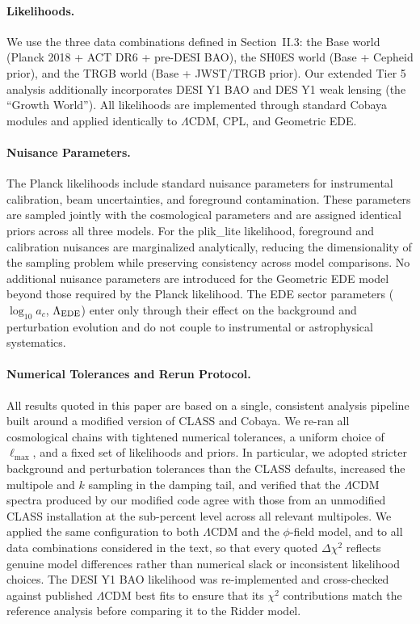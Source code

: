 \documentclass[a4paper,11pt]{article}
\begin{document}
\paragraph{Likelihoods.}
We use the three data combinations defined in Section~II.3: the Base world (Planck 2018 + ACT DR6 + pre-DESI BAO), the SH0ES world (Base + Cepheid prior), and the TRGB world (Base + JWST/TRGB prior). Our extended Tier 5 analysis additionally incorporates DESI Y1 BAO and DES Y1 weak lensing (the ``Growth World''). All likelihoods are implemented through standard Cobaya modules and applied identically to $\Lambda$CDM, CPL, and Geometric EDE.

\paragraph{Nuisance Parameters.}
The Planck likelihoods include standard nuisance parameters for instrumental calibration, beam uncertainties, and foreground contamination. These parameters are sampled jointly with the cosmological parameters and are assigned identical priors across all three models. For the plik\_lite likelihood, foreground and calibration nuisances are marginalized analytically, reducing the dimensionality of the sampling problem while preserving consistency across model comparisons. No additional nuisance parameters are introduced for the Geometric EDE model beyond those required by the Planck likelihood. The EDE sector parameters ($\log_{10}a_c$, $\Lambda_{\rm EDE}$) enter only through their effect on the background and perturbation evolution and do not couple to instrumental or astrophysical systematics.

\paragraph{Numerical Tolerances and Rerun Protocol.}
All results quoted in this paper are based on a single, consistent analysis pipeline built around a modified version of CLASS and Cobaya. We re-ran all cosmological chains with tightened numerical tolerances, a uniform choice of $\ell_{\max}$, and a fixed set of likelihoods and priors. In particular, we adopted stricter background and perturbation tolerances than the CLASS defaults, increased the multipole and $k$ sampling in the damping tail, and verified that the $\Lambda$CDM spectra produced by our modified code agree with those from an unmodified CLASS installation at the sub-percent level across all relevant multipoles. We applied the same configuration to both $\Lambda$CDM and the $\phi$-field model, and to all data combinations considered in the text, so that every quoted $\Delta\chi^2$ reflects genuine model differences rather than numerical slack or inconsistent likelihood choices. The DESI Y1 BAO likelihood was re-implemented and cross-checked against published $\Lambda$CDM best fits to ensure that its $\chi^2$ contributions match the reference analysis before comparing it to the Ridder model.
\end{document}
